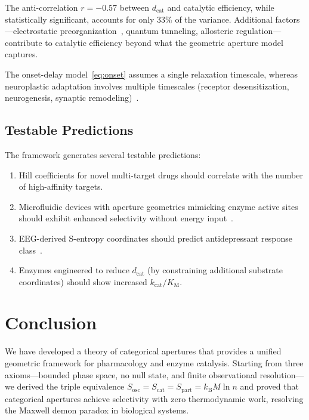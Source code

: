 \documentclass[10pt,twocolumn]{article}
\theoremstyle{definition}
\theoremstyle{remark}
\newcommand{\kB}{k_{\mathrm{B}}}
\newcommand{\Sosc}{S_{\mathrm{osc}}}
\newcommand{\Scat}{S_{\mathrm{cat}}}
\newcommand{\Spart}{S_{\mathrm{part}}}
\newcommand{\dcat}{d_{\mathrm{cat}}}
\newcommand{\kcat}{k_{\mathrm{cat}}}
\newcommand{\KM}{K_{\mathrm{M}}}
\begin{document}
The anti-correlation $r = -0.57$ between $\dcat$ and catalytic
efficiency, while statistically significant, accounts for only
33\% of the variance.  Additional factors---electrostatic
preorganization~\cite{Klinman2013}, quantum tunneling,
allosteric regulation---contribute to catalytic efficiency
beyond what the geometric aperture model captures.

The onset-delay model~\eqref{eq:onset} assumes a single
relaxation timescale, whereas neuroplastic adaptation involves
multiple timescales (receptor desensitization, neurogenesis,
synaptic remodeling)~\cite{Stahl2021}.

\subsection{Testable Predictions}

The framework generates several testable predictions:
\begin{enumerate}[leftmargin=*]
  \item Hill coefficients for novel multi-target drugs should
        correlate with the number of high-affinity targets.
  \item Microfluidic devices with aperture geometries mimicking
        enzyme active sites should exhibit enhanced selectivity
        without energy input~\cite{Whitesides2006,Stone2004}.
  \item EEG-derived S-entropy coordinates should predict
        antidepressant response class~\cite{Leuchter2012}.
  \item Enzymes engineered to reduce $\dcat$ (by constraining
        additional substrate coordinates) should show
        increased $\kcat/\KM$.
\end{enumerate}

\section{Conclusion}\label{sec:conclusion}

We have developed a theory of categorical apertures that provides
a unified geometric framework for pharmacology and enzyme catalysis.
Starting from three axioms---bounded phase space, no null state,
and finite observational resolution---we derived the triple
equivalence $\Sosc = \Scat = \Spart = \kB M \ln n$ and proved
that categorical apertures achieve selectivity with zero
thermodynamic work, resolving the Maxwell demon paradox in
biological systems.
\end{document}
